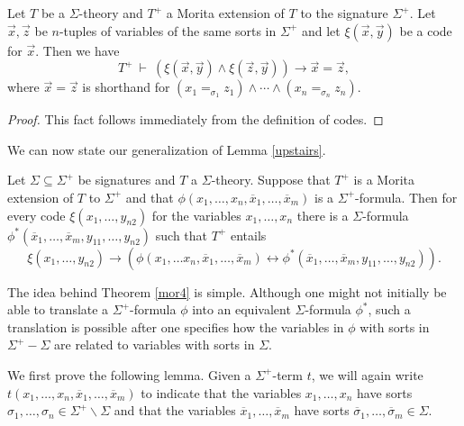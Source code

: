 \begin{lemma} Let $T$ be a $\Sigma$-theory and
  $T^+$ a Morita extension of $T$ to the signature $\Sigma ^+$.  Let
  $\vec{x},\vec{z}$ be $n$-tuples of variables of the same sorts in
  $\Sigma ^+$ and let $\xi (\vec{x},\vec{y})$ be a code for $\vec{x}$.
  Then we have
  \[ T^+ \: \vdash \: (\xi (\vec{x},\vec{y})\wedge \xi
    (\vec{z},\vec{y}))\to \vec{x}=\vec{z} ,\] where $\vec{x}=\vec{z}$ is
  shorthand for
  $(x_1=_{\sigma _1}z_1)\wedge\cdots\wedge (x_n=_{\sigma
    _n}z_n)$. \end{lemma}


\begin{proof} This fact follows immediately from the definition of
  codes.
\end{proof}

We can now state our generalization of Lemma \ref{upstairs}.  

\begin{thm}[Barrett] Let $\Sigma\subseteq\Sigma^+$ be signatures and
  $T$ a $\Sigma$-theory. Suppose that $T^+$ is a Morita extension of
  $T$ to $\Sigma^+$ and that
  $\phi(x_1,\ldots, x_n, \overline{x}_1,\ldots, \overline{x}_m)$ is a
  $\Sigma^+$-formula. Then for every code $\xi(x_1,\ldots, y_{n2})$
  for the variables $x_1,\ldots, x_n$ there is a $\Sigma$-formula
  $\phi^*(\overline{x}_1,\ldots, \overline{x}_m, y_{11}, \ldots,
  y_{n2})$ such that $T^+$ entails
  \[ \xi(x_1,\ldots, y_{n2})\rightarrow (\phi(x_1,\ldots x_n,
    \overline{x}_1,\ldots,
    \overline{x}_m)\leftrightarrow\phi^*(\overline{x}_1,\ldots,\overline{x}_m,
    y_{11},\ldots, y_{n2})) .
\] \label{mor4}
\end{thm}

The idea behind Theorem \ref{mor4} is simple. Although one might not
initially be able to translate a $\Sigma^+$-formula $\phi$ into an
equivalent $\Sigma$-formula $\phi^*$, such a translation is possible
after one specifies how the variables in $\phi$ with sorts in
$\Sigma^+-\Sigma$ are related to variables with sorts in $\Sigma$.

We first prove the following lemma. Given a $\Sigma^+$-term $t$, we
will again write
$t(x_1,\ldots, x_n,\overline{x}_1,\ldots, \overline{x}_m)$ to indicate
that the variables $x_1,\ldots, x_n$ have sorts
$\sigma_1,\ldots, \sigma_n\in\Sigma^+\backslash\Sigma$ and that the
variables $\overline{x}_1,\ldots, \overline{x}_m$ have sorts
$\overline{\sigma}_1,\ldots, \overline{\sigma}_m\in\Sigma$.

